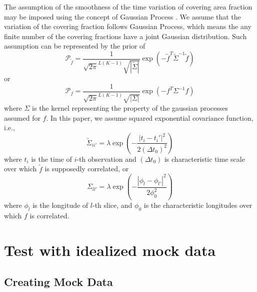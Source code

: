 \documentclass[iop,numberedappendix,apj,]{emulateapj}
\def\fast{\tilde f}
\begin{document}
The assumption of the smoothness of the time variation of covering area fraction may be imposed using the concept of Gaussian Process \citep{Rasmussen2005}. 
We assume that the variation of the covering fraction follows Gaussian Process, which means the any finite number of the covering fractions have a joint Gaussian distribution. 
Such assumption can be represented by the prior of 
\begin{equation}
\mathcal{P}_{\fast} = \frac{1}{\sqrt{ 2 \pi }^{L(K-1)} \sqrt{| \tilde \Sigma |} } \exp( - \fast^{T} \tilde \Sigma ^{-1} \fast ) 
\end{equation}
or
\begin{equation}
\mathcal{P}_f = \frac{1}{\sqrt{ 2 \pi }^{L(K-1)} \sqrt{| \Sigma  |}} \exp( - f^{T} \Sigma ^{-1} f ) 
\end{equation}
where $\Sigma $ is the kernel representing the property of the gaussian processes assumed for $f$.
In this paper, we assume squared exponential covariance function, i.e., 
\begin{equation}
\tilde \Sigma _{ii'} = \lambda \exp \left( - \frac{|t_i- t_i'|^2}{2 (\Delta t_0) ^2} \right)
\end{equation}
where $t_i$ is the time of $i$-th observation and $(\Delta t_0)$ is characteristic time scale over which $\fast $ is supposedly correlated, or 
\begin{equation}
\Sigma _{ll'} = \lambda \exp \left( - \frac{|\phi_l- \phi_{l'}|^2}{2 \phi_0^2} \right)
\end{equation}
where $\phi_l$ is the longitude of $l$-th slice, and $\phi_0$ is the characteristic longitudes over which $f$ is correlated.  


\newpage

\section{Test with idealized mock data}
\label{s:mockdata}



\subsection{Creating Mock Data}
\label{ss:createmockdata}
\end{document}
